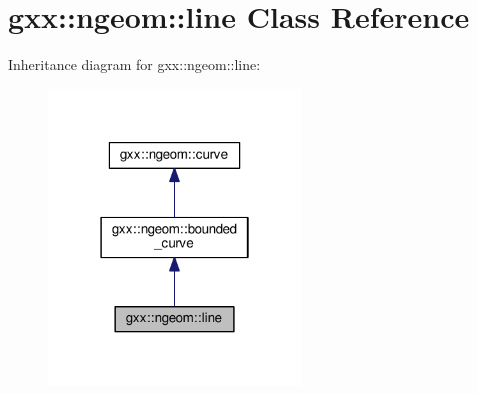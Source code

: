 \hypertarget{classgxx_1_1ngeom_1_1line}{}\section{gxx\+:\+:ngeom\+:\+:line Class Reference}
\label{classgxx_1_1ngeom_1_1line}


Inheritance diagram for gxx\+:\+:ngeom\+:\+:line\+:
\nopagebreak
\begin{figure}[H]
\begin{center}
\leavevmode
\includegraphics[width=190pt]{classgxx_1_1ngeom_1_1line__inherit__graph}
\end{center}
\end{figure}


